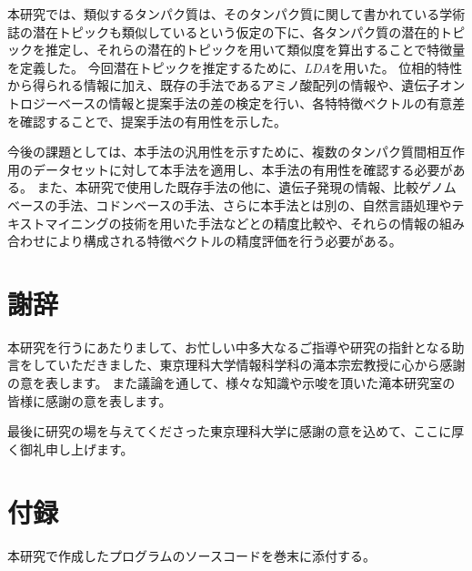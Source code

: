 \documentclass[titlepage,12pt]{jreport}
\begin{document}
本研究では、類似するタンパク質は、そのタンパク質に関して書かれている学術誌の潜在トピックも類似しているという仮定の下に、各タンパク質の潜在的トピックを推定し、それらの潜在的トピックを用いて類似度を算出することで特徴量を定義した。 今回潜在トピックを推定するために、{\it LDA}を用いた。 位相的特性から得られる情報に加え、既存の手法であるアミノ酸配列の情報や、遺伝子オントロジーベースの情報と提案手法の差の検定を行い、各特特徴ベクトルの有意差を確認することで、提案手法の有用性を示した。

今後の課題としては、本手法の汎用性を示すために、複数のタンパク質間相互作用のデータセットに対して本手法を適用し、本手法の有用性を確認する必要がある。 また、本研究で使用した既存手法の他に、遺伝子発現の情報、比較ゲノムベースの手法、コドンベースの手法、さらに本手法とは別の、自然言語処理やテキストマイニングの技術を用いた手法などとの精度比較や、それらの情報の組み合わせにより構成される特徴ベクトルの精度評価を行う必要がある。



\chapter*{謝辞}
本研究を行うにあたりまして、お忙しい中多大なるご指導や研究の指針となる助言をしていただきました、東京理科大学情報科学科の滝本宗宏教授に心から感謝の意を表します。 また議論を通して、様々な知識や示唆を頂いた滝本研究室の皆様に感謝の意を表します。

最後に研究の場を与えてくださった東京理科大学に感謝の意を込めて、ここに厚く御礼申し上げます。
\chapter*{付録}
本研究で作成したプログラムのソースコードを巻末に添付する。

%
\end{document}
